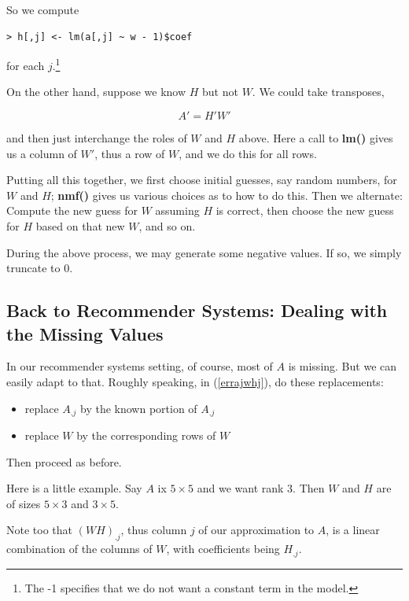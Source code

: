 So we compute

\begin{lstlisting}
> h[,j] <- lm(a[,j] ~ w - 1)$coef
\end{lstlisting}

for each $j$.\footnote{The -1 specifies that we do not want a constant term in
the model.}

On the other hand, suppose we know $H$ but not $W$.  We could take 
transposes,

\begin{equation}
A' = H' W'
\end{equation}

and then just interchange the roles of $W$ and $H$ above.  Here a call
to {\bf lm()} gives us a column of $W'$, thus a row of $W$, and we do
this for all rows.

Putting all this together, we first choose initial guesses, say random
numbers, for $W$ and $H$; {\bf nmf()} gives us various choices as to how
to do this.  Then we alternate: Compute the new guess for $W$ assuming
$H$ is correct, then choose the new guess for $H$ based on that new $W$,
and so on.

During the above process, we may generate some negative values.  If so,
we simply truncate to 0.

\subsection{Back to Recommender Systems:  Dealing with the Missing Values}

In our recommender systems setting, of course, most of $A$ is missing.
But we can easily adapt to that.  Roughly speaking, in (\ref{errajwhj}),
do these replacements:

\begin{itemize}

\item replace $A_{.j}$ by the known portion of $A_{.j}$

\item replace $W$ by the corresponding rows of $W$

\end{itemize} 

Then proceed as before.  

Here is a little example.  Say $A$ ix $5 \times 5$ and we want rank 3.
Then $W$ and $H$ are of sizes $5 \times 3$ and $3 \times5$.  

Note too that $(WH)_{.j}$, thus column $j$ of our approximation to $A$,
is a linear combination of the columns of $W$, with coefficients being
$H_{.j}$.


